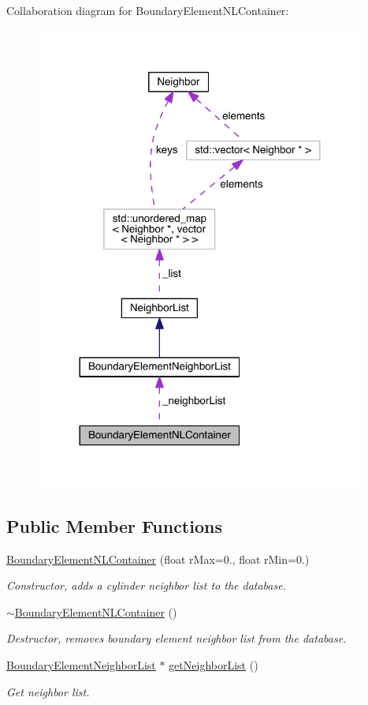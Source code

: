 Collaboration diagram for Boundary\+Element\+N\+L\+Container\+:\nopagebreak
\begin{figure}[H]
\begin{center}
\leavevmode
\includegraphics[width=308pt]{classBoundaryElementNLContainer__coll__graph}
\end{center}
\end{figure}
\subsection*{Public Member Functions}
\begin{DoxyCompactItemize}
\item 
\hyperlink{classBoundaryElementNLContainer_a6192ee44d946090df7d3518ae4035b9c}{Boundary\+Element\+N\+L\+Container} (float r\+Max=0., float r\+Min=0.)
\begin{DoxyCompactList}\small\item\em Constructor, adds a cylinder neighbor list to the database. \end{DoxyCompactList}\item 
\hyperlink{classBoundaryElementNLContainer_a0621abe49cc7cf101e011ac3178a1519}{$\sim$\+Boundary\+Element\+N\+L\+Container} ()
\begin{DoxyCompactList}\small\item\em Destructor, removes boundary element neighbor list from the database. \end{DoxyCompactList}\item 
\hyperlink{classBoundaryElementNeighborList}{Boundary\+Element\+Neighbor\+List} $\ast$ \hyperlink{classBoundaryElementNLContainer_aa665161110c46e0a2af9f760c96afe19}{get\+Neighbor\+List} ()
\begin{DoxyCompactList}\small\item\em Get neighbor list. \end{DoxyCompactList}\end{DoxyCompactItemize}
